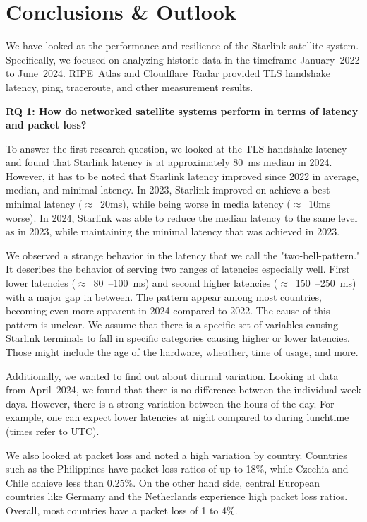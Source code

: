 \chapter{Conclusions \& Outlook} \label{sec:conclusion}

We have looked at the performance and resilience of the Starlink satellite
system. Specifically, we focused on analyzing historic data in the timeframe
January~2022 to June~2024. RIPE~Atlas and Cloudflare~Radar provided TLS
handshake latency, ping, traceroute, and other measurement results.

\textbf{RQ 1: How do networked satellite systems perform in terms of latency
	and packet loss?}

To answer the first research question, we looked at the TLS handshake latency and found
that Starlink latency is at approximately 80~ms median in 2024. However, it has
to be noted that Starlink latency improved since 2022 in average, median, and
minimal latency. In 2023, Starlink improved on achieve a best minimal latency
($\approx$~20ms), while being worse in media latency ($\approx$~10ms worse). In
2024, Starlink was able to reduce the median latency to the same level as in
2023, while maintaining the minimal latency that was achieved in 2023.

We observed a strange behavior in the latency that we call the
"two-bell-pattern." It describes the behavior of serving two ranges
of latencies especially well. First lower latencies ($\approx$~80~--100~ms) and
second higher latencies ($\approx$~150~--250~ms) with a major gap in between.
The pattern appear among most countries, becoming even more apparent in 2024
compared to 2022. The cause of this pattern is unclear. We assume that there
is a specific set of variables causing Starlink terminals to fall in specific
categories causing higher or lower latencies. Those might include the age of
the hardware, wheather, time of usage, and more.

Additionally, we wanted to find out about diurnal variation. Looking at data
from April~2024, we found that there is no difference between the individual
week days. However, there is a strong variation between the hours of the day.
For example, one can expect lower latencies at night compared to during
lunchtime (times refer to UTC).

We also looked at packet loss and noted a high variation by country. Countries
such as the Philippines have packet loss ratios of up to 18\%, while Czechia
and Chile achieve less than 0.25\%. On the other hand side, central European
countries like Germany and the Netherlands experience high packet loss ratios.
Overall, most countries have a packet loss of 1 to 4\%.

